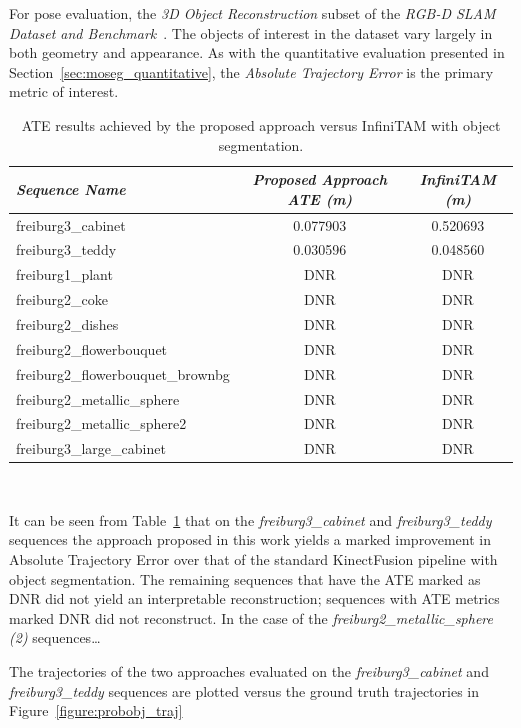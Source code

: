 For pose evaluation, the \textit{3D Object Reconstruction} subset of the 
\textit{RGB-D SLAM Dataset and Benchmark}~\cite{Sturm2012}. The objects of interest in 
the dataset vary largely in both geometry and appearance. As with the quantitative 
evaluation presented in Section~\ref{sec:moseg_quantitative}, the 
\textit{Absolute Trajectory Error} is the primary metric of interest.

\begin{table}[!htbp]
  \centering
  \begin{tabular}{l c c}
    \emph{Sequence Name} & \emph{Proposed Approach ATE (m)} & \emph{InfiniTAM (m)}\\
    \midrule
    \textsf{freiburg3\_cabinet} & 0.077903 & 0.520693\\
    \textsf{freiburg3\_teddy}   & 0.030596 & 0.048560 \\
    \textsf{freiburg1\_plant}   & DNR & DNR \\
    \textsf{freiburg2\_coke}   & DNR & DNR \\
    \textsf{freiburg2\_dishes}   & DNR & DNR \\
    \textsf{freiburg2\_flowerbouquet}   & DNR & DNR \\
    \textsf{freiburg2\_flowerbouquet\_brownbg}   & DNR & DNR \\
    \textsf{freiburg2\_metallic\_sphere}   & DNR & DNR \\
    \textsf{freiburg2\_metallic\_sphere2}   & DNR & DNR \\
    \textsf{freiburg3\_large\_cabinet}   & DNR & DNR
  \end{tabular}
  \caption[Probabilistic Object Reconstruction ATE]
  {ATE results achieved by the proposed approach versus InfiniTAM with object segmentation.}
~\label{table:probobj_ate}
\end{table}

It can be seen from Table~\ref{table:probobj_ate} that on the \textit{freiburg3\_cabinet} 
and \textit{\textsf{freiburg3\_teddy}} sequences the approach proposed in this work 
yields a marked improvement in Absolute Trajectory Error over that of the standard KinectFusion 
pipeline with object segmentation. The remaining sequences that have the ATE marked as DNR did 
not yield an interpretable reconstruction; sequences with ATE metrics marked DNR did not 
reconstruct. In the case of the \textit{freiburg2\_metallic\_sphere (2)} sequences\ldots

The trajectories of the two approaches evaluated on the \textit{freiburg3\_cabinet} 
and \textit{\textsf{freiburg3\_teddy}} sequences are plotted versus the ground truth trajectories 
in Figure~\ref{figure:probobj_traj}

